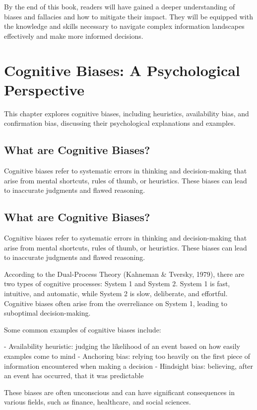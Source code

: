 \documentclass{report}%
\begin{document}
By the end of this book, readers will have gained a deeper understanding of biases and fallacies and how to mitigate their impact. They will be equipped with the knowledge and skills necessary to navigate complex information landscapes effectively and make more informed decisions.%
\chapter{Cognitive Biases: A Psychological Perspective}%
This chapter explores cognitive biases, including heuristics, availability bias, and confirmation bias, discussing their psychological explanations and examples.

%
\section{What are Cognitive Biases?}%
Cognitive biases refer to systematic errors in thinking and decision-making that arise from mental shortcuts, rules of thumb, or heuristics. These biases can lead to inaccurate judgments and flawed reasoning.

%
\section{What are Cognitive Biases?}

Cognitive biases refer to systematic errors in thinking and decision-making that arise from mental shortcuts, rules of thumb, or heuristics. These biases can lead to inaccurate judgments and flawed reasoning.

According to the Dual-Process Theory (Kahneman \& Tversky, 1979), there are two types of cognitive processes: System 1 and System 2. System 1 is fast, intuitive, and automatic, while System 2 is slow, deliberate, and effortful. Cognitive biases often arise from the overreliance on System 1, leading to suboptimal decision-making.

Some common examples of cognitive biases include:

- Availability heuristic: judging the likelihood of an event based on how easily examples come to mind
- Anchoring bias: relying too heavily on the first piece of information encountered when making a decision
- Hindsight bias: believing, after an event has occurred, that it was predictable

These biases are often unconscious and can have significant consequences in various fields, such as finance, healthcare, and social sciences.
\end{document}
